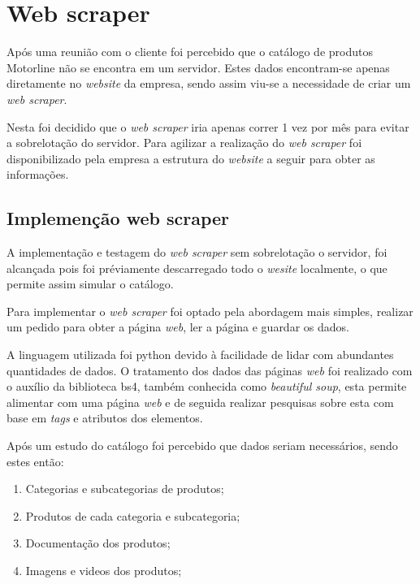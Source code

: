 

\section{Web scraper}

Após uma reunião com o cliente foi percebido que o catálogo de produtos Motorline não se encontra em um servidor. Estes dados encontram-se apenas diretamente no \textit{website} da empresa, sendo assim viu-se a necessidade de criar um \textit{web scraper}.

Nesta foi decidido que o \textit{web scraper} iria apenas correr 1 vez por mês para evitar a sobrelotação do servidor. Para agilizar a realização do \textit{web scraper} foi disponibilizado pela empresa a estrutura do \textit{website} a seguir para obter as informações.

\newpage

\subsection{Implemenção web scraper}
A implementação e testagem do \textit{web scraper} sem sobrelotação o servidor, foi alcançada pois foi préviamente descarregado todo o \textit{wesite} localmente, o que permite assim simular o catálogo.

Para implementar o \textit{web scraper} foi optado pela abordagem mais simples, realizar um pedido para obter a página \textit{web}, ler a página e guardar os dados.

A linguagem utilizada foi python devido à facilidade de lidar com abundantes quantidades de dados. O tratamento dos dados das páginas \textit{web} foi realizado com o auxílio da biblioteca bs4, também conhecida como \textit{beautiful soup}, esta permite alimentar com uma página \textit{web} e de seguida realizar pesquisas sobre esta com base em \textit{tags} e atributos dos elementos.

Após um estudo do catálogo foi percebido que dados seriam necessários, sendo estes então:
\begin{enumerate}
    \item Categorias e subcategorias de produtos;
    \item Produtos de cada categoria e subcategoria;
    \item Documentação dos produtos;
    \item Imagens e videos dos produtos;
\end{enumerate}

\newpage

